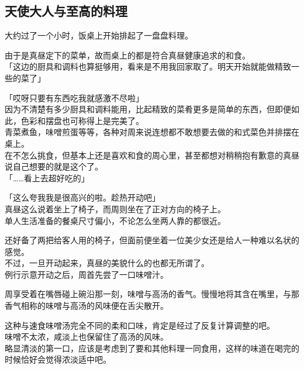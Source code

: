 ﻿\subsection{天使大人与至高的料理}

大约过了一个小时，饭桌上开始排起了一盘盘料理。

由于是真昼定下的菜单，故而桌上的都是符合真昼健康追求的和食。\\

「这边的厨具和调料也算挺够用，看来是不用我回家取了。明天开始就能做精致一些的菜了」

「哎呀只要有东西吃我就感激不尽啦」\\

因为不清楚有多少厨具和调料能用，比起精致的菜肴更多是简单的东西，但即便如此，色彩和摆盘也可称得上是完美了。\\

青菜煮鱼，味噌煎蛋等等，各种对周来说连想都不敢想要去做的和式菜色并排摆在桌上。\\

在不怎么挑食，但基本上还是喜欢和食的周心里，甚至都想对稍稍抱有歉意的真昼说自己想要的就是这个了。\\

「……看上去超好吃的」

「这么夸我我是很高兴的啦。趁热开动吧」\\

真昼这么说着坐上了椅子，而周则坐在了正对方向的椅子上。\\

单人生活准备的餐桌尺寸偏小，不论怎么坐两人靠的都很近。

还好备了两把给客人用的椅子，但面前便坐着一位美少女还是给人一种难以名状的感觉。\\

不过，一旦开动起来，真昼的美貌什么的也都无所谓了。\\

例行示意开动之后，周首先尝了一口味噌汁。

周享受着在嘴唇碰上碗沿那一刻，味噌与高汤的香气。慢慢地将其含在嘴里，与那香气相称的味噌与高汤的风味便在舌尖散开。

这种与速食味噌汤完全不同的柔和口味，肯定是经过了反复计算调整的吧。\\

味噌不太浓，咸淡上也保留住了高汤的风味。\\

略显清淡的第一口，应该是考虑到了要和其他料理一同食用，这样的味道在喝完的时候恰好会觉得浓淡适中吧。\\

